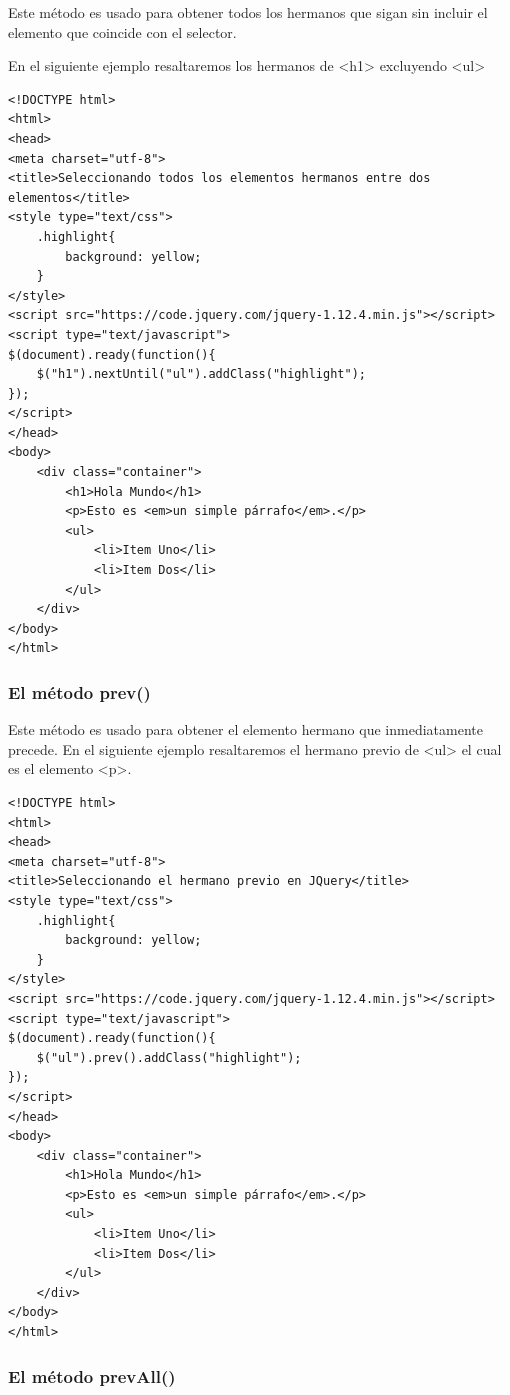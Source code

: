 \documentclass[a4paper, oneside]{article}
\begin{document}
Este método es usado para obtener todos los hermanos que sigan sin incluir el elemento que coincide con el selector. 

En el siguiente ejemplo resaltaremos los hermanos de <h1> excluyendo <ul>

\begin{verbatim}
<!DOCTYPE html>
<html>
<head>
<meta charset="utf-8">
<title>Seleccionando todos los elementos hermanos entre dos elementos</title>
<style type="text/css">
    .highlight{
        background: yellow;
    }        
</style>
<script src="https://code.jquery.com/jquery-1.12.4.min.js"></script>
<script type="text/javascript">
$(document).ready(function(){
    $("h1").nextUntil("ul").addClass("highlight");
});
</script>
</head>
<body>
    <div class="container">
        <h1>Hola Mundo</h1>
        <p>Esto es <em>un simple párrafo</em>.</p>
        <ul>
            <li>Item Uno</li>
            <li>Item Dos</li>
        </ul>
    </div>
</body>
</html>                                		
\end{verbatim}

\subsubsection{El método prev()}
\label{sec:orgaccccb8}

Este método es usado para obtener el elemento hermano que inmediatamente precede. En el siguiente ejemplo resaltaremos  el hermano previo de <ul> el cual es el elemento <p>.

\begin{verbatim}
<!DOCTYPE html>
<html>
<head>
<meta charset="utf-8">
<title>Seleccionando el hermano previo en JQuery</title>
<style type="text/css">
    .highlight{
        background: yellow;
    }        
</style>
<script src="https://code.jquery.com/jquery-1.12.4.min.js"></script>
<script type="text/javascript">
$(document).ready(function(){
    $("ul").prev().addClass("highlight");
});
</script>
</head>
<body>
    <div class="container">
        <h1>Hola Mundo</h1>
        <p>Esto es <em>un simple párrafo</em>.</p>
        <ul>
            <li>Item Uno</li>
            <li>Item Dos</li>
        </ul>
    </div>
</body>
</html>                                		
\end{verbatim}

\subsubsection{El método prevAll()}
\label{sec:orgd5bc163}
\end{document}
